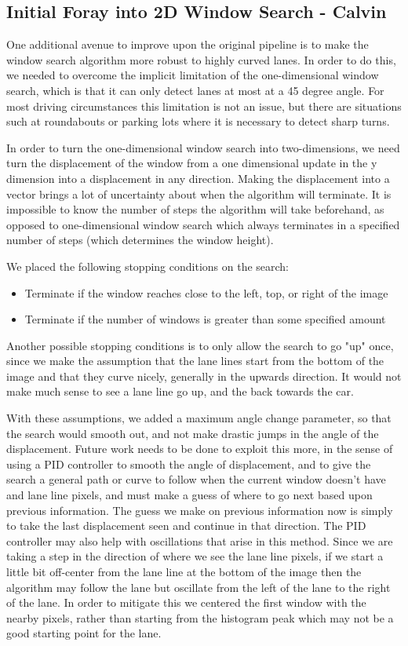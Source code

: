 \documentclass[twoside,twocolumn]{article}
\begin{document}
\subsection{Initial Foray into 2D Window Search - Calvin}
\par One additional avenue to improve upon the original pipeline is to make the window search algorithm more robust to highly curved lanes. In order to do this, we needed to overcome the implicit limitation of the one-dimensional window search, which is that it can only detect lanes at most at a 45 degree angle. For most driving circumstances this limitation is not an issue, but there are situations such at roundabouts or parking lots where it is necessary to detect sharp turns.
\par In order to turn the one-dimensional window search into two-dimensions, we need turn the displacement of the window from a one dimensional update in the y dimension into a displacement in any direction. Making the displacement into a vector brings a lot of uncertainty about when the algorithm will terminate. It is impossible to know the number of steps the algorithm will take beforehand, as opposed to one-dimensional window search which always terminates in a specified number of steps (which determines the window height).
\par We placed the following stopping conditions on the search:
\begin{itemize}
\item Terminate if the window reaches close to the left, top, or right of the image
\item Terminate if the number of windows is greater than some specified amount
\end{itemize}
Another possible stopping conditions is to only allow the search to go "up" once, since we make the assumption that the lane lines start from the bottom of the image and that they curve nicely, generally in the upwards direction. It would not make much sense to see a lane line go up, and the back towards the car.
\par With these assumptions, we added a maximum angle change parameter, so that the search would smooth out, and not make drastic jumps in the angle of the displacement. Future work needs to be done to exploit this more, in the sense of using a PID controller to smooth the angle of displacement, and to give the search a general path or curve to follow when the current window doesn't have and lane line pixels, and must make a guess of where to go next based upon previous information. The guess we make on previous information now is simply to take the last displacement seen and continue in that direction. The PID controller may also help with oscillations that arise in this method. Since we are taking a step in the direction of where we see the lane line pixels, if we start a little bit off-center from the lane line at the bottom of the image then the algorithm may follow the lane but oscillate from the left of the lane to the right of the lane. In order to mitigate this we centered the first window with the nearby pixels, rather than starting from the histogram peak which may not be a good starting point for the lane.
\end{document}

